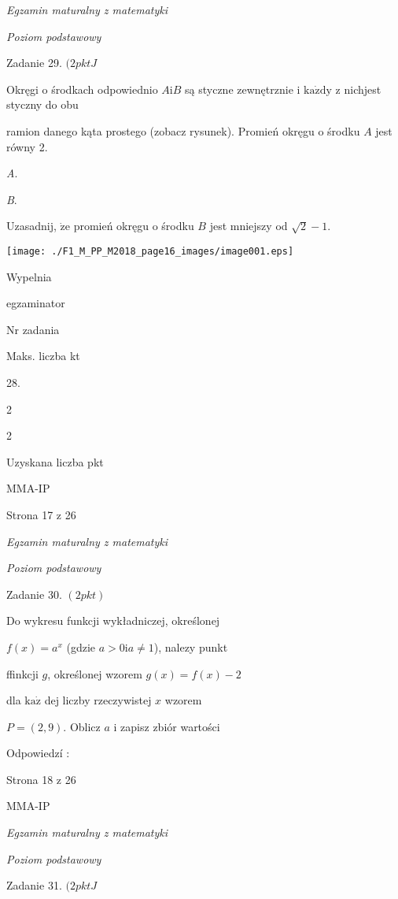 \documentclass[a4paper,12pt]{article}
\begin{document}
{\it Egzamin maturalny z matematyki}

{\it Poziom podstawowy}

Zadanie 29. $(2pktJ$

Okręgi o środkach odpowiednio $A\mathrm{i}B$ są styczne zewnętrznie i $\mathrm{k}\mathrm{a}\dot{\mathrm{z}}\mathrm{d}\mathrm{y}$ z nichjest styczny do obu

ramion danego kąta prostego (zobacz rysunek). Promień okręgu o środku $A$ jest równy 2.

{\it A}.

{\it B}.

Uzasadnij, $\dot{\mathrm{z}}\mathrm{e}$ promień okręgu o środku $B$ jest mniejszy od $\sqrt{2}-1.$
\begin{center}
\texttt{[image: ./F1\_M\_PP\_M2018\_page16\_images/image001.eps]}
\end{center}
Wypelnia

egzaminator

Nr zadania

Maks. liczba kt

28.

2

2

Uzyskana liczba pkt

MMA-IP

Strona 17 z 26





{\it Egzamin maturalny z matematyki}

{\it Poziom podstawowy}

Zadanie 30. $(2pkt)$

Do wykresu funkcji wykładniczej, określonej

$f(x)=a^{x}$ (gdzie $a>0 \mathrm{i} a\neq 1$), nalezy punkt

ffinkcji $g$, określonej wzorem $g(x)=f(x)-2$

dla $\mathrm{k}\mathrm{a}\dot{\mathrm{z}}$ dej liczby rzeczywistej $x$ wzorem

$P=(2,9)$. Oblicz $a$ i zapisz zbiór wartości

Odpowiedzí :

Strona 18 z 26

MMA-IP





{\it Egzamin maturalny z matematyki}

{\it Poziom podstawowy}

Zadanie 31. $(2pktJ$
\end{document}
